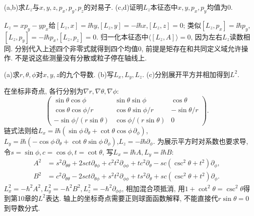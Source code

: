 \begin{exercise}
(a,b)求$L_z$与$x,y,z,p_x,p_y,p_z$的对易子. (c,d)证明$L_z$本征态中$x,y,p_x,p_y$均值为0.
\end{exercise}
\begin{solution}
$L_z=xp_y-yp_x$给$[L_z,x]=\ii\hbar y$,$[L_z,y]=-\ii\hbar x$,$[L_z,z]=0$; 类似$[L_z,p_x]=\ii\hbar p_y$,$[L_z,p_y]=-\ii\hbar p_x$,$[L_z,p_z]=0$. 归一化本征态中$\langle[L_z,A]\rangle=0$, 因为左右$L_z$读数相同. 分别代入上述四个非零式就得到四个均值0, 前提是矩存在和共同定义域允许操作. 不是说这些测量没有分散或粒子停在轴线上.
\end{solution}
\begin{exercise}
(a)求$r,\theta,\phi$对$x,y,z$的九个导数. (b)写$L_x,L_y,L_z$. (c)分别展开平方并相加得到$L^2$.
\end{exercise}
\begin{solution}
在坐标非奇点, 各行分别为$\nabla r,\nabla\theta,\nabla\phi$:
\[
\begin{pmatrix}
\sin\theta\cos\phi&\sin\theta\sin\phi&\cos\theta\\
\cos\theta\cos\phi/r&\cos\theta\sin\phi/r&-\sin\theta/r\\
-\sin\phi/(r\sin\theta)&\cos\phi/(r\sin\theta)&0
\end{pmatrix}.
\]
链式法则给$L_x=\ii\hbar(\sin\phi\,\partial_\theta+\cot\theta\cos\phi\,\partial_\phi)$,$L_y=\ii\hbar(-\cos\phi\,\partial_\theta+\cot\theta\sin\phi\,\partial_\phi)$,$L_z=-\ii\hbar\partial_\phi$. 为展示平方时对系数也要求导, 令$s=\sin\phi,c=\cos\phi,t=\cot\theta$, 写$L_x=\ii\hbar A,L_y=\ii\hbar B$:
\[
\begin{aligned}
A^2&=s^2\partial_{\theta\theta}+2sct\partial_{\theta\phi}+c^2t^2\partial_{\phi\phi}
+tc^2\partial_\theta-sc(\csc^2\theta+t^2)\partial_\phi,\\
B^2&=c^2\partial_{\theta\theta}-2sct\partial_{\theta\phi}+s^2t^2\partial_{\phi\phi}
+ts^2\partial_\theta+sc(\csc^2\theta+t^2)\partial_\phi.
\end{aligned}
\]
$L_x^2=-\hbar^2A^2,L_y^2=-\hbar^2B^2,L_z^2=-\hbar^2\partial_{\phi\phi}$, 相加混合项抵消, 用$1+\cot^2\theta=\csc^2\theta$得到第10章的$L^2$表达. 轴上的坐标奇点需要正则球面函数解释, 不能直接代$r\sin\theta=0$到导数分式.
\end{solution}
